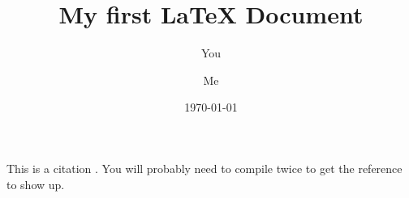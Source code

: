 \documentclass[a4paper]{article}
\begin{document}
\title{My first LaTeX Document}
\author{You \and Me}
\date{\today}
\maketitle 

This is a citation \cite{greenwade93}. You will probably need to compile twice to get the reference to show up. 



\end{document}
